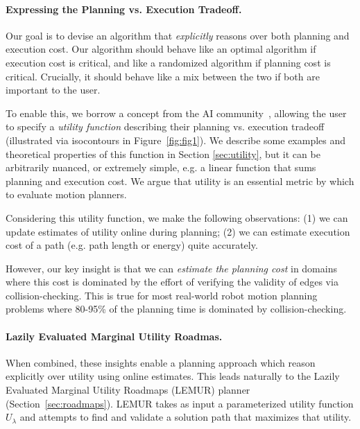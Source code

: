 \paragraph{Expressing the Planning vs. Execution Tradeoff.}
Our goal is to devise an algorithm that \emph{explicitly} reasons over both planning
and execution cost. Our algorithm should behave like an optimal algorithm 
if execution cost is critical, and like a randomized algorithm if planning
cost is critical. Crucially, it should behave like a mix between the two 
if both are important to the user.

To enable this, we borrow a concept from the AI community~\citep{ruml2007bugsy},
allowing the user to specify a \emph{utility function} describing
their planning vs. execution tradeoff
(illustrated via isocontours in Figure~\ref{fig:fig1}).
We describe some examples and theoretical properties of this
function in Section \ref{sec:utility}, but it can be arbitrarily nuanced, 
or extremely simple,
e.g. a linear function that sums planning and execution cost.
We argue that utility is an essential metric
by which to evaluate motion planners.

Considering this utility function, we make the following observations: 
(1) we can update estimates of utility online during planning;
(2) we can estimate execution cost of a path
(e.g. path length or energy) quite accurately.

However, our key insight is that we can
\emph{estimate the planning cost} in domains
where this cost is dominated by the effort of
verifying the validity of edges via collision-checking.
This is true for most real-world robot motion planning problems
where 80-95\% of the planning time
is dominated by collision-checking.

\paragraph{Lazily Evaluated Marginal Utility Roadmas.}
When combined, these insights enable a planning approach which
reason explicitly over utility using online estimates.
This leads naturally to the
Lazily Evaluated Marginal Utility Roadmaps (LEMUR) planner
(Section~\ref{sec:roadmaps}).
LEMUR takes as input a parameterized utility function $U_\lambda$ 
and attempts to find and validate a solution path
that maximizes that utility.

